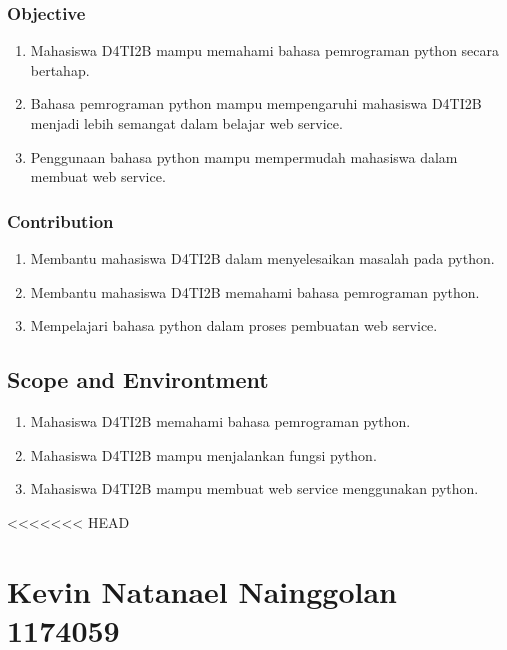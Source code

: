 \subsubsection{Objective}
\begin{enumerate}
	\item Mahasiswa D4TI2B mampu memahami bahasa pemrograman python secara bertahap.
	\item Bahasa pemrograman python mampu mempengaruhi mahasiswa D4TI2B menjadi lebih semangat dalam belajar web service.
	\item Penggunaan bahasa python mampu mempermudah mahasiswa dalam membuat web service.
\end{enumerate}
\subsubsection{Contribution}
\begin{enumerate}
	\item Membantu mahasiswa D4TI2B dalam menyelesaikan masalah pada python.
	\item Membantu mahasiswa D4TI2B memahami bahasa pemrograman python.
	\item Mempelajari bahasa python dalam proses pembuatan web service.
\end{enumerate}
		
\subsection{Scope and Environtment}
\begin{enumerate}
	\item Mahasiswa D4TI2B memahami bahasa pemrograman python.
	\item Mahasiswa D4TI2B mampu menjalankan fungsi python.
	\item Mahasiswa D4TI2B mampu membuat web service menggunakan python.
\end{enumerate}

<<<<<<< HEAD
\section{Kevin Natanael Nainggolan 1174059}
